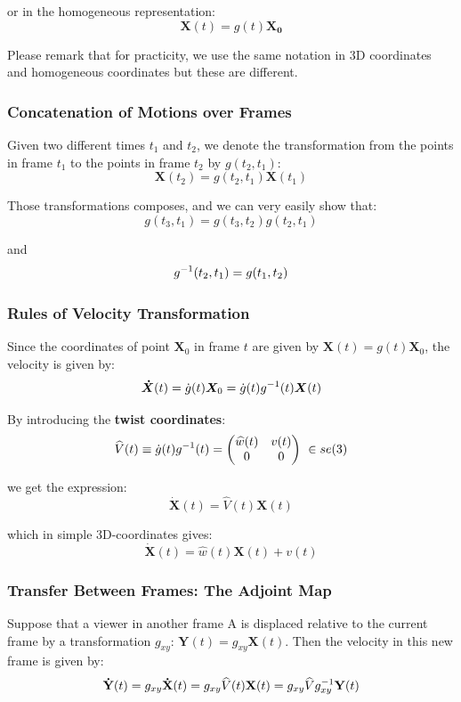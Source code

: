 or in the homogeneous representation:
	\[\bm{X}(t) = g(t)\bm{X_0}\]

Please remark that for practicity, we use the same notation
in 3D coordinates and homogeneous coordinates but these are different.


\subsubsection{Concatenation of Motions over Frames}%
\label{ssub:concatenation_of_motions_over_frames}

Given two different times $t_1$ and $t_2$, we denote the transformation from
the points in frame $t_1$ to the points in frame $t_2$ by $g(t_2,t_1)$:
	\[\bm{X}(t_2) = g(t_2,t_1) \bm{X}(t_1)\]

Those transformations composes, and we can very easily show that:
	\[g(t_3,t_1) = g(t_3,t_2) g(t_2,t_1)\]

and
	\[g^{-1}(t_2,t_1) = g(t_1,t_2)\]


\subsubsection{Rules of Velocity Transformation}%
\label{ssub:rules_of_velocity_transformation}

Since the coordinates of point $\bm{X}_0$ in frame $t$ are given by
$\bm{X}(t) = g(t) \bm{X}_0$, the velocity is given by:
	\[\bm{\dot{X}}(t) = \dot{g}(t)\bm{X}_0 = \dot{g}(t)g^{-1}(t) \bm{X}(t)\]

By introducing the \textbf{twist coordinates}:
	\[\widehat{V}(t) \equiv \dot{g}(t)g^{-1}(t) = \begin{pmatrix}
		\widehat{w}(t) & v(t) \\
		0 & 0 \\
	\end{pmatrix}\ \in se(3)\]

we get the expression:
	\[\boxed{\bm{\dot{X}}(t) = \widehat{V}(t)\bm{X}(t)}\]

which in simple 3D-coordinates gives:
	\[\bm{\dot{X}}(t) = \widehat{w}(t)\bm{X}(t) + v(t)\]


\subsubsection{Transfer Between Frames: The Adjoint Map}%
\label{ssub:transfer_between_frames_the_adjoint_map}

Suppose that a viewer in another frame A is displaced relative to the current frame
by a transformation $g_{xy}$: $\mathbf{Y}(t) = g_{xy} \mathbf{X}(t)$.
Then the velocity in this new frame is given by:
\[\mathbf{\dot{Y}}(t)
	= g_{xy} \mathbf{\dot{X}}(t)
	= g_{xy} \widehat{V}(t) \mathbf{X}(t)
	= g_{xy} \widehat{V} g_{xy}^{-1} \mathbf{Y}(t)\]

